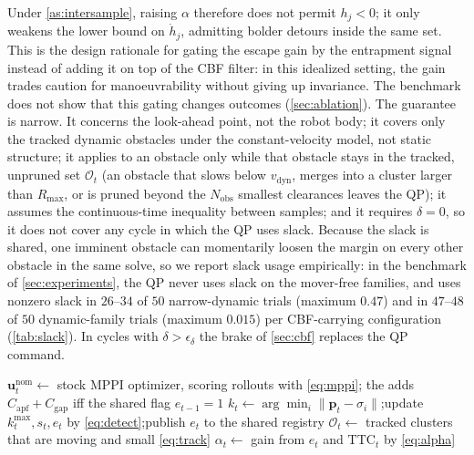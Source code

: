 Under \cref{as:intersample}, raising $\alpha$ therefore does not permit $h_j<0$; it only weakens the lower bound on $\dot h_j$, admitting bolder detours inside the same set. This is the design rationale for gating the escape gain by the entrapment signal instead of adding it on top of the CBF filter: in this idealized setting, the gain trades caution for manoeuvrability without giving up invariance. The benchmark does not show that this gating changes outcomes (\cref{sec:ablation}). The guarantee is narrow. It concerns the look-ahead point, not the robot body; it covers only the tracked dynamic obstacles under the constant-velocity model, not static structure; it applies to an obstacle only while that obstacle stays in the tracked, unpruned set $\mathcal{O}_t$ (an obstacle that slows below $v_{\mathrm{dyn}}$, merges into a cluster larger than $R_{\max}$, or is pruned beyond the $N_{\mathrm{obs}}$ smallest clearances leaves the QP); it assumes the continuous-time inequality between samples; and it requires $\delta=0$, so it does not cover any cycle in which the QP uses slack. Because the slack is shared, one imminent obstacle can momentarily loosen the margin on every other obstacle in the same solve, so we report slack usage empirically: in the benchmark of \cref{sec:experiments}, the QP never uses slack on the mover-free families, and uses nonzero slack in $26$--$34$ of $50$ narrow-dynamic trials (maximum $0.47$) and in $47$--$48$ of $50$ dynamic-family trials (maximum $0.015$) per CBF-carrying configuration (\cref{tab:slack}). In cycles with $\delta>\epsilon_\delta$ the brake of \cref{sec:cbf} replaces the QP command.

\begin{algorithm}[t]
\caption{One \sname{} control cycle (\texttt{computeVelocityCommands})}\label{alg:semppi}
\DontPrintSemicolon
{}
$\mathbf{u}^{\mathrm{nom}}_t\gets$ stock MPPI optimizer, scoring rollouts with \eqref{eq:mppi}; the  adds $C_{\mathrm{apf}}+C_{\mathrm{gap}}$ iff the shared flag $e_{t-1}=1$\;
$k_t\gets\arg\min_i\|\mathbf{p}_t-\sigma_i\|$;\quad update $k^{\max}_t,s_t,e_t$ by \eqref{eq:detect};\quad publish $e_t$ to the shared registry\;
$\mathcal{O}_t\gets$ tracked clusters that are moving and small \eqref{eq:track}\;
$\alpha_t\gets$ gain from $e_t$ and $\mathrm{TTC}_t$ by \eqref{eq:alpha}\;
\;
\end{algorithm}

